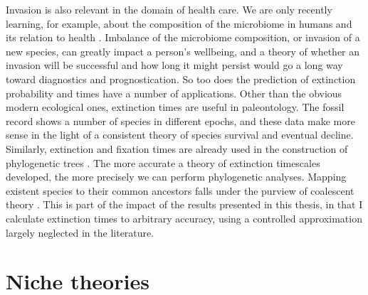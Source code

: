Invasion is also relevant in the domain of health care. 
We are only recently learning, for example, about the composition of the microbiome in humans and its relation to health \cite{Coburn2015,Korem2015,Manichanh2010,Theriot2014,Kinross2011}. 
Imbalance of the microbiome composition, or invasion of a new species, can greatly impact a person's wellbeing, and a theory of whether an invasion will be successful and how long it might persist would go a long way toward diagnostics and prognostication.
So too does the prediction of extinction probability and times have a number of applications. 
Other than the obvious modern ecological ones, extinction times are useful in paleontology. 
The fossil record shows a number of species in different epochs, and these data make more sense in the light of a consistent theory of species survival and eventual decline. %
Similarly, extinction and fixation times are already used in the construction of phylogenetic trees \cite{Rogers2014,Rice2004,Blythe2007}. 
The more accurate a theory of extinction timescales developed, the more precisely we can perform phylogenetic analyses. 
Mapping existent species to their common ancestors falls under the purview of coalescent theory \cite{Kingman1982}. %
This is part of the impact of the results presented in this thesis, in that I calculate extinction times to arbitrary accuracy, using a controlled approximation largely neglected in the literature. %






\section{Niche theories}

